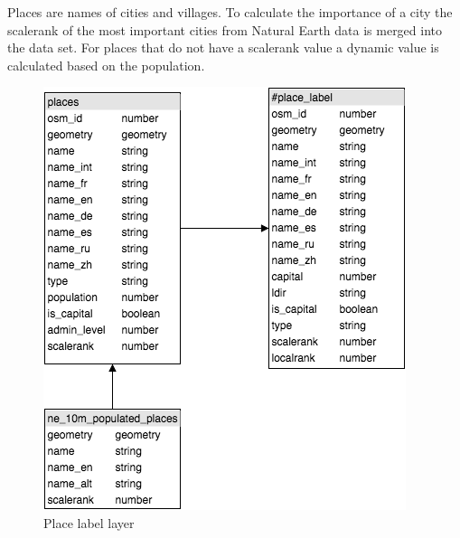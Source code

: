 Places are names of cities and villages. To calculate the importance of a city
the scalerank of the most important cities from Natural Earth data is merged into the
\osm{} data set. For places that do not have a scalerank value a dynamic value is calculated
based on the population.

\begin{figure}[H]
\centering
  \includegraphics[scale=0.6]{images/place_layer.png}
  \caption{Place label layer}
\end{figure}

